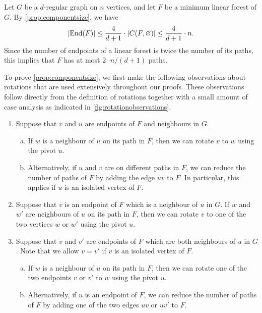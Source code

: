 \documentclass[11pt]{article}
\makeatletter
\theoremstyle{plain}
\theoremstyle{definition}
\renewenvironment{proof}[1][\proofname]
{\par\pushQED{\qed}
	\normalfont\topsep6\p@\@plus6\p@\relax\trivlist
	\item[\hskip\labelsep\bfseries#1\@addpunct{.}]
	\ignorespaces}
{\popQED\endtrivlist\@endpefalse}
\let\emptyset\varnothing
\DeclarePairedDelimiter{\abs}{\lvert}{\rvert}
\DeclareMathOperator{\End}{End}
\makeatother
\begin{document}
\begin{proof}[Proof of \cref{thm:smalllinearforest}]
    Let $G$ be a $d$-regular graph on $n$ vertices, and let $F$ be a minimum linear forest of $G$. By \cref{prop:componentsize}, we have
    \[
        \abs{\End(F)} \le \frac{4}{d+1} \cdot \abs{C(F,\emptyset)} \le \frac{4}{d+1} \cdot n.
    \]
    Since the number of endpoints of a linear forest is twice the number of its paths, this implies that $F$ has at most $2 \cdot n/(d+1)$ paths.
\end{proof}

To prove \cref{prop:componentsize}, we first make the following observations about rotations that are used extensively throughout our proofs. These observations follow directly from the definition of rotations together with a small amount of case analysis as indicated in \cref{fig:rotationobservations}.
\begin{enumerate}[(R1)]
    \item Suppose that $v$ and $u$ are endpoints of $F$ and neighbours in $G$.
    \begin{enumerate}[(a),ref=(R1\alph*)]
        \item\label{obs:rotateonetoone} If $w$ is a neighbour of $u$ on its path in $F$, then we can rotate $v$ to $w$ using the pivot $u$.
        \item\label{obs:reduceonetoone} Alternatively, if $u$ and $v$ are on different paths in $F$, we can reduce the number of paths of $F$ by adding the edge $u v$ to $F$. In particular, this applies if $u$ is an isolated vertex of $F$.
    \end{enumerate}
    \item\label{obs:rotateonetotwo} Suppose that $v$ is an endpoint of $F$ which is a neighbour of $u$ in $G$. If $w$ and $w'$ are neighbours of $u$ on its path in $F$, then we can rotate $v$ to one of the two vertices $w$ or $w'$ using the pivot $u$.
    \item Suppose that $v$ and $v'$ are endpoints of $F$ which are both neighbours of $u$ in $G$. Note that we allow $v = v'$ if $v$ is an isolated vertex of $F$.
    \begin{enumerate}[(a),ref=(R3\alph*)]
        \item\label{obs:rotatetwotoone} If $w$ is a neighbour of $u$ on its path in $F$, then we can rotate one of the two endpoints $v$ or $v'$ to $w$ using the pivot $u$.
        \item\label{obs:reducetwotoone} Alternatively, if $u$ is an endpoint of $F$, we can reduce the number of paths of $F$ by adding one of the two edges $u v$ or $u v'$ to $F$.
    \end{enumerate}
\end{enumerate}
\end{document}
